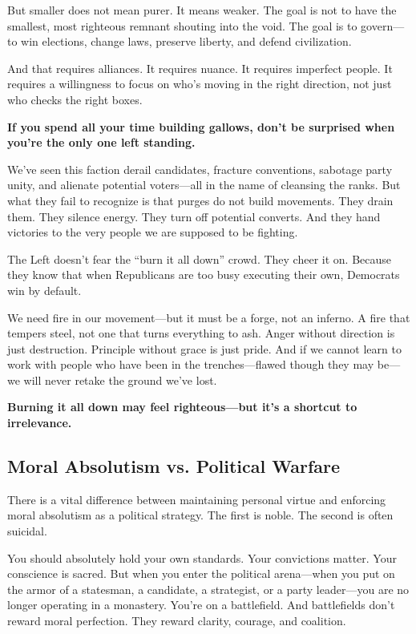 But smaller does not mean purer. It means weaker. The goal is not to have the smallest, most righteous remnant shouting into the void. The goal is to govern—to win elections, change laws, preserve liberty, and defend civilization.

And that requires alliances. It requires nuance. It requires imperfect people. It requires a willingness to focus on who’s moving in the right direction, not just who checks the right boxes.

\textbf{If you spend all your time building gallows, don’t be surprised when you’re the only one left standing.}

We’ve seen this faction derail candidates, fracture conventions, sabotage party unity, and alienate potential voters—all in the name of cleansing the ranks. But what they fail to recognize is that purges do not build movements. They drain them. They silence energy. They turn off potential converts. And they hand victories to the very people we are supposed to be fighting.

The Left doesn’t fear the ``burn it all down'' crowd. They cheer it on. Because they know that when Republicans are too busy executing their own, Democrats win by default.

We need fire in our movement—but it must be a forge, not an inferno. A fire that tempers steel, not one that turns everything to ash. Anger without direction is just destruction. Principle without grace is just pride. And if we cannot learn to work with people who have been in the trenches—flawed though they may be—we will never retake the ground we've lost.

\textbf{Burning it all down may feel righteous—but it’s a shortcut to irrelevance.}










\subsection*{Moral Absolutism vs. Political Warfare}

There is a vital difference between maintaining personal virtue and enforcing moral absolutism as a political strategy. The first is noble. The second is often suicidal.

You should absolutely hold your own standards. Your convictions matter. Your conscience is sacred. But when you enter the political arena—when you put on the armor of a statesman, a candidate, a strategist, or a party leader—you are no longer operating in a monastery. You’re on a battlefield. And battlefields don’t reward moral perfection. They reward clarity, courage, and coalition.

